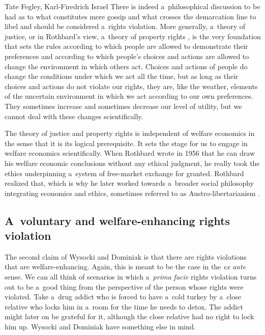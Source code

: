 \begin{artengenv2auth}{Tate Fegley, Karl-Firedrich Israel}
There is indeed a~philosophical discussion to be had as to what constitutes mere gossip and what crosses the demarcation line to libel and should be considered a~rights violation. More generally, a~theory of justice, or in Rothbard's view, a~theory of property rights 
\parencite[][]{rothbard_ethics_1998}, %
 is the very foundation that sets the rules according to which people are allowed to demonstrate their preferences and according to which people's choices and actions are allowed to change the environment in which others act. Choices and actions of people do change the conditions under which we act all the time, but as long as their choices and actions do not violate our rights, they are, like the weather, elements of the uncertain environment in which we act according to our own preferences. They sometimes increase and sometimes decrease our level of utility, but we cannot deal with these changes scientifically.



The theory of justice and property rights is independent of welfare economics in the sense that it is its logical prerequisite. It sets the stage for us to engage in welfare economics scientifically. When Rothbard wrote in 1956 that he can draw his welfare economic conclusions without any ethical judgment, he really took the ethics underpinning a~system of free-market exchange for granted. Rothbard realized that, which is why he later worked towards a~broader social philosophy integrating economics and ethics, sometimes referred to as Austro-libertarianism 
\parencite[][]{holcombe_murray_1999}.%




\subsection{A~voluntary and welfare-enhancing rights violation}



The second claim of Wysocki and Dominiak 
\parencite*[][]{wysocki_how_2023} %
 is that there are rights violations that are welfare-enhancing. Again, this is meant to be the case in the \textit{ex ante} sense. We can all think of scenarios in which a~\textit{prima facie} rights violation turns out to be a~good thing from the perspective of the person whose rights were violated. Take a~drug addict who is forced to have a~cold turkey by a~close relative who locks him in a~room for the time he needs to detox. The addict might later on be grateful for it, although the close relative had no right to lock him up. Wysocki and Dominiak have something else in mind.




\end{artengenv2auth}
